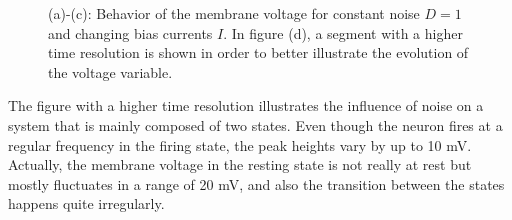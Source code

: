 \documentclass[12pt,a4paper]{article}
\begin{document}
\begin{figure}[H]
	\caption{(a)-(c): Behavior of the membrane voltage for constant noise $D=1$ and changing bias currents $I$. In figure (d), a segment with a higher time resolution is shown in order to better illustrate the evolution of the voltage variable.}
	\label{currentnoise} 
\end{figure}
The figure with a higher time resolution illustrates the influence of noise on a system that is mainly composed of two states. Even though the neuron fires at a regular frequency in the firing state, the peak heights vary by up to 10 mV. Actually, the membrane voltage in the resting state is not really at rest but mostly fluctuates in a range of 20 mV, and also the transition between the states happens quite irregularly.
\end{document}
